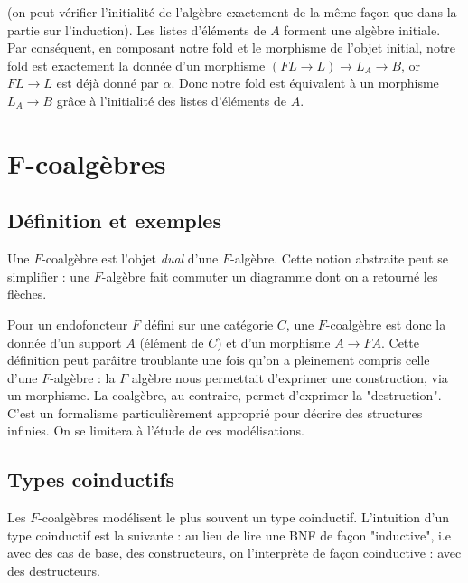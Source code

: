 \documentclass{article}
\begin{document}
(on peut vérifier l'initialité de l'algèbre exactement de la même façon que dans la partie sur l'induction). Les listes d'éléments de $A$ forment une algèbre initiale. Par conséquent, en composant notre fold et le morphisme de l'objet initial, notre fold est exactement la donnée  d'un morphisme $(FL \rightarrow L) \rightarrow L_A \rightarrow B $, or $FL \rightarrow L$ est déjà donné par $\alpha$. Donc notre fold est équivalent à un morphisme $L_A \rightarrow B$ grâce à l'initialité des listes d'éléments de $A$.


\section{F-coalgèbres}

\subsection{Définition et exemples}

Une $F$-coalgèbre est l'objet \textit{dual} d'une $F$-algèbre. Cette notion abstraite peut se simplifier : une $F$-algèbre fait commuter un diagramme dont on a retourné les flèches.

\begin{center}
\end{center}

Pour un endofoncteur $F$ défini sur une catégorie $C$, une $F$-coalgèbre est donc la donnée d'un support $A$ (élément de $C$) et d'un morphisme $A \rightarrow FA$. Cette définition peut parâitre troublante une fois qu'on a pleinement compris celle d'une $F$-algèbre : la $F$ algèbre nous permettait d'exprimer une construction, via un morphisme. La coalgèbre, au contraire, permet d'exprimer la "destruction". C'est un formalisme particulièrement approprié  pour décrire des structures infinies. On se limitera à l'étude de ces modélisations.

\subsection{Types coinductifs}
Les $F$-coalgèbres  modélisent le plus souvent un type coinductif. L'intuition d'un type coinductif est la suivante : au lieu de lire une BNF de façon "inductive", i.e avec des cas de base, des constructeurs, on l'interprète de façon coinductive : avec des destructeurs.  \\
\end{document}
